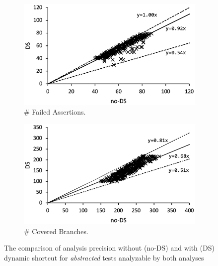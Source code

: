 \begin{figure}
  \centering
  \begin{subfigure}[t]{0.48\textwidth}
    \includegraphics[width=\linewidth]{img/precision-fail}
    \vspace*{-1.5em}
    \caption{\# Failed Assertions.}
    \label{fig:precision-fail}
  \end{subfigure}
  \begin{subfigure}[t]{0.48\textwidth}
    \includegraphics[width=\linewidth]{img/precision-branch}
    \vspace*{-1.5em}
    \caption{\# Covered Branches.}
    \label{fig:precision-branch}
  \end{subfigure}
  \vspace*{-1em}
  \caption{The comparison of analysis precision without (no-DS) and with (DS)
  dynamic shortcut for  \textit{abstracted} tests analyzable by both
  analyses}
  \label{fig:precision}
  \vspace*{-1.5em}
\end{figure}


